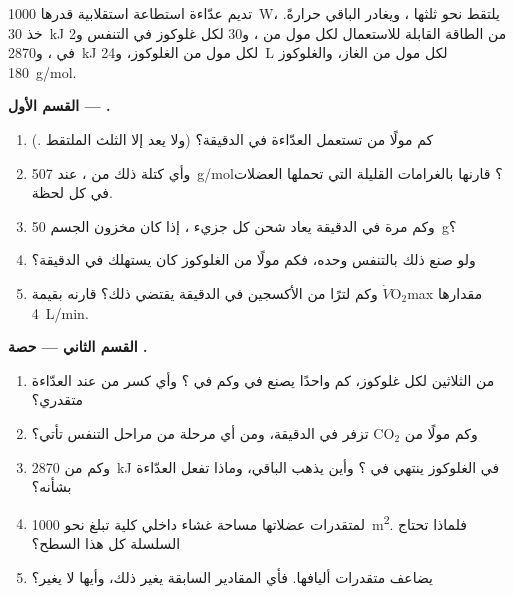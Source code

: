\begin{problem}
\label{pb:g12:respiration-fermentation:1}
تديم عدّاءة استطاعة استقلابية قدرها \qty{1000}{W}، يلتقط نحو ثلثها
، ويغادر الباقي حرارةً. خذ \qty{30}{kJ} من الطاقة القابلة للاستعمال
لكل مول من ، و30  لكل غلوكوز في التنفس و2 في ،
و\qty{2870}{kJ} لكل مول من الغلوكوز، و\qty{24}{L} لكل مول من الغاز،
والغلوكوز \qty{180}{g/mol}.

\medskip
\noindent\textbf{القسم الأول --- .}
\begin{enumerate}
  \item كم مولًا من  تستعمل العدّاءة في الدقيقة؟ (ولا يعد إلا الثلث
        الملتقط .)
  \item وأي كتلة ذلك من ، عند \qty{507}{g/mol}؟ قارنها بالغرامات
        القليلة التي تحملها العضلات في كل لحظة.
  \item وكم مرة في الدقيقة يعاد شحن كل جزيء ، إذا كان مخزون الجسم
        \qty{50}{g}؟
  \item ولو صنع ذلك  بالتنفس وحده، فكم مولًا من الغلوكوز كان
        يستهلك في الدقيقة؟
  \item وكم لترًا من الأكسجين في الدقيقة يقتضي ذلك؟ قارنه
        بقيمة $\dot V\!\mathrm{O_2}$max مقدارها \qty{4}{L/min}.
\end{enumerate}

\medskip
\noindent\textbf{القسم الثاني --- حصة .}
\begin{enumerate}[resume]
  \item من الثلاثين  لكل غلوكوز، كم واحدًا يصنع في  وكم
        في ؟ وأي كسر من  عند العدّاءة متقدري؟
  \item وكم مولًا من $\mathrm{CO_2}$ تزفر في الدقيقة، ومن أي مرحلة من
        مراحل التنفس تأتي؟
  \item وكم من \qty{2870}{kJ} في الغلوكوز ينتهي في ؟ وأين يذهب
        الباقي، وماذا تفعل العدّاءة بشأنه؟
  \item لمتقدرات عضلاتها مساحة غشاء داخلي كلية تبلغ نحو
        \qty{1000}{m^2}. فلماذا تحتاج السلسلة كل هذا السطح؟
  \item {} يضاعف متقدرات أليافها. فأي المقادير السابقة يغير ذلك،
        وأيها لا يغير؟
\end{enumerate}


\end{problem}
